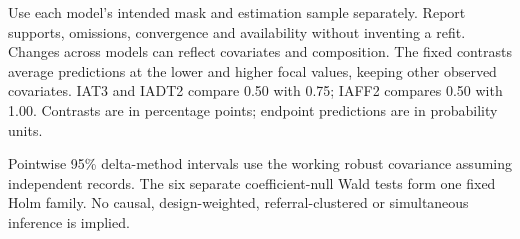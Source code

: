 Use each model's intended mask and estimation sample separately. Report supports, omissions, convergence and availability without inventing a refit. Changes across models can reflect covariates and composition. The fixed contrasts average predictions at the lower and higher focal values, keeping other observed covariates. IAT3 and IADT2 compare 0.50 with 0.75; IAFF2 compares 0.50 with 1.00. Contrasts are in percentage points; endpoint predictions are in probability units.

Pointwise 95\% delta-method intervals use the working robust covariance assuming independent records. The six separate coefficient-null Wald tests form one fixed Holm family. No causal, design-weighted, referral-clustered or simultaneous inference is implied.
